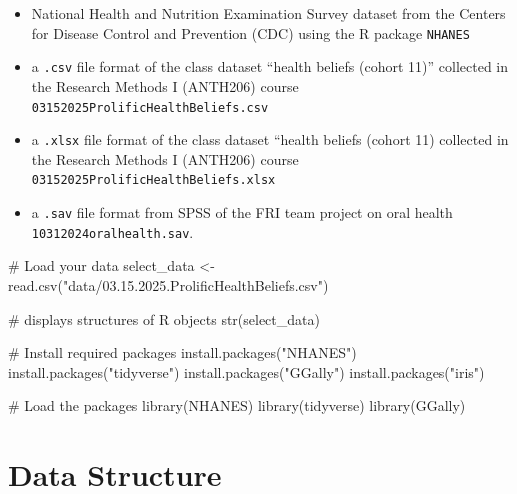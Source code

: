 \documentclass[
  english,
  letterpaper,
  DIV=11,
  numbers=noendperiod]{scrreprt}
\newenvironment{Shaded}{\begin{snugshade}}{\end{snugshade}}
\newcommand{\CommentTok}[1]{\textcolor[rgb]{0.37,0.37,0.37}{#1}}
\newcommand{\FunctionTok}[1]{\textcolor[rgb]{0.28,0.35,0.67}{#1}}
\newcommand{\NormalTok}[1]{\textcolor[rgb]{0.00,0.23,0.31}{#1}}
\newcommand{\OtherTok}[1]{\textcolor[rgb]{0.00,0.23,0.31}{#1}}
\newcommand{\StringTok}[1]{\textcolor[rgb]{0.13,0.47,0.30}{#1}}
\begin{document}
\begin{itemize}
\item
  National Health and Nutrition Examination Survey dataset from the
  Centers for Disease Control and Prevention (CDC) using the R package
  \texttt{NHANES}
\item
  a \texttt{.csv} file format of the class dataset ``health beliefs
  (cohort 11)'' collected in the Research Methods I (ANTH206) course
  \texttt{03152025ProlificHealthBeliefs.csv}
\item
  a \texttt{.xlsx} file format of the class dataset ``health beliefs
  (cohort 11) collected in the Research Methods I (ANTH206) course
  \texttt{03152025ProlificHealthBeliefs.xlsx}
\item
  a \texttt{.sav} file format from SPSS of the FRI team project on oral
  health \texttt{10312024oralhealth.sav}.
\end{itemize}

\begin{Shaded}
\begin{Highlighting}[]
\CommentTok{\# Load your data}
\NormalTok{select\_data }\OtherTok{\textless{}{-}} \FunctionTok{read.csv}\NormalTok{(}\StringTok{"data/03.15.2025.ProlificHealthBeliefs.csv"}\NormalTok{)}

\CommentTok{\# displays structures of R objects}
\FunctionTok{str}\NormalTok{(select\_data)}
\end{Highlighting}
\end{Shaded}

\begin{Shaded}
\begin{Highlighting}[]
\CommentTok{\# Install required packages}
\FunctionTok{install.packages}\NormalTok{(}\StringTok{"NHANES"}\NormalTok{)}
\FunctionTok{install.packages}\NormalTok{(}\StringTok{"tidyverse"}\NormalTok{)}
\FunctionTok{install.packages}\NormalTok{(}\StringTok{"GGally"}\NormalTok{)}
\FunctionTok{install.packages}\NormalTok{(}\StringTok{"iris"}\NormalTok{)}

\CommentTok{\# Load the packages}
\FunctionTok{library}\NormalTok{(NHANES)}
\FunctionTok{library}\NormalTok{(tidyverse)}
\FunctionTok{library}\NormalTok{(GGally)}
\end{Highlighting}
\end{Shaded}

\section{Data Structure}\label{data-structure}
\end{document}
